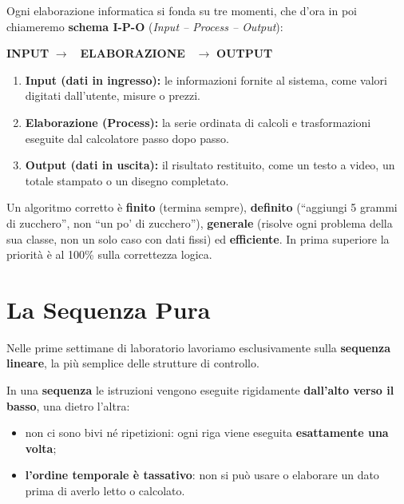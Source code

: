 Ogni elaborazione informatica si fonda su tre momenti, che d'ora in poi chiameremo \textbf{schema I-P-O} (\emph{Input -- Process -- Output}):

\vspace{0.5em}
\begin{center}
\begin{tcolorbox}[colback=white,colframe=PiazzaGray!40,width=0.88\textwidth,arc=2mm,halign=center]
\textbf{\color{BoxBlue}INPUT} $\longrightarrow$
\colorbox{PiazzaPrimary!10}{\textbf{\color{PiazzaPrimary}~ELABORAZIONE~}} $\longrightarrow$
\textbf{\color{BoxGreen}OUTPUT}
\end{tcolorbox}
\end{center}

\begin{enumerate}
  \item \textbf{Input (dati in ingresso):} le informazioni fornite al sistema, come valori digitati dall'utente, misure o prezzi.
  \item \textbf{Elaborazione (Process):} la serie ordinata di calcoli e trasformazioni eseguite dal calcolatore passo dopo passo.
  \item \textbf{Output (dati in uscita):} il risultato restituito, come un testo a video, un totale stampato o un disegno completato.
\end{enumerate}

\begin{consiglio}
Un algoritmo corretto è \textbf{finito} (termina sempre), \textbf{definito} (``aggiungi 5 grammi di zucchero'', non ``un po' di zucchero''), \textbf{generale} (risolve ogni problema della sua classe, non un solo caso con dati fissi) ed \textbf{efficiente}. In prima superiore la priorità è al 100\% sulla correttezza logica.
\end{consiglio}

\section{La Sequenza Pura}

Nelle prime settimane di laboratorio lavoriamo esclusivamente sulla \textbf{sequenza lineare}, la più semplice delle strutture di controllo.

\begin{concetto}
In una \textbf{sequenza} le istruzioni vengono eseguite rigidamente \textbf{dall'alto verso il basso}, una dietro l'altra:
\begin{itemize}
  \item non ci sono bivi né ripetizioni: ogni riga viene eseguita \textbf{esattamente una volta};
  \item \textbf{l'ordine temporale è tassativo}: non si può usare o elaborare un dato prima di averlo letto o calcolato.
\end{itemize}
\end{concetto}

